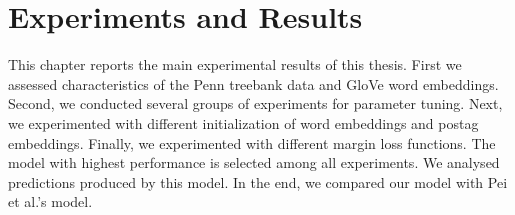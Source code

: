 
\chapter{Experiments and Results}
\label{cha:results}
This chapter reports the main experimental results of this thesis. First we assessed characteristics of the Penn treebank data and GloVe word embeddings. Second, we conducted several groups of experiments for parameter tuning. Next, we experimented with different initialization of word embeddings and postag embeddings. Finally, we experimented with different margin loss functions. The model with highest performance is selected among all experiments. We analysed predictions produced by this model. In the end, we compared our model with Pei et al.'s model.

